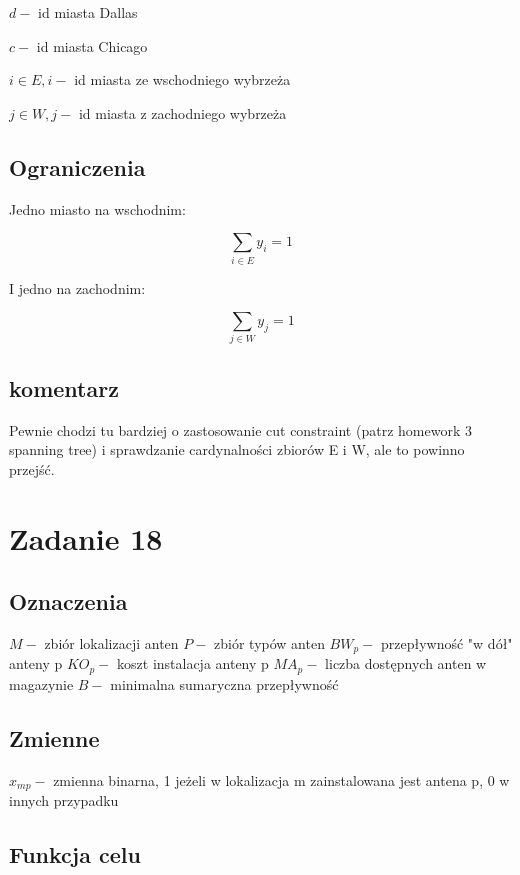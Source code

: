 \documentclass{article}
\begin{document}
$d - $ id miasta Dallas

$c - $ id miasta Chicago

$i \in E, i - $ id miasta ze wschodniego wybrzeża

$j \in W, j - $ id miasta z zachodniego wybrzeża

\subsection{Ograniczenia}

Jedno miasto na wschodnim:

\begin{equation}
  \sum_{i \in E} y_i = 1
\end{equation}


I jedno na zachodnim:

\begin{equation}
  \sum_{j \in W} y_j = 1
\end{equation}

\subsection{komentarz}
Pewnie chodzi tu bardziej o zastosowanie cut constraint (patrz homework 3 spanning tree) i sprawdzanie cardynalności zbiorów E i W, ale to powinno przejść.


\section{Zadanie 18}

\subsection{Oznaczenia}
$M - $ zbiór lokalizacji anten
$P - $ zbiór typów anten
$BW_p - $ przepływność "w dół" anteny p
$KO_p - $ koszt instalacja anteny p
$MA_p - $ liczba dostępnych anten w magazynie
$B - $ minimalna sumaryczna przepływność

\subsection{Zmienne}
$x_{mp} - $ zmienna binarna, 1 jeżeli w lokalizacja m zainstalowana jest antena p, 0 w innych przypadku

\subsection{Funkcja celu}
\end{document}
